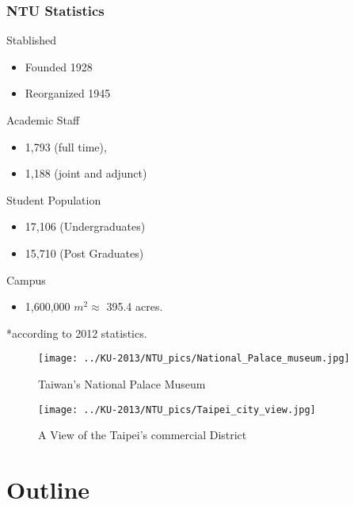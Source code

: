 \begin{frame} \frametitle{NTU Statistics}
 \begin{orangeitemize}
  \item Stablished
    \begin{itemize}
     \item Founded 1928
     \item Reorganized 1945
    \end{itemize}
  \item Academic Staff
    \begin{itemize}
     \item 1,793 (full time),
     \item 1,188 (joint and adjunct)
    \end{itemize}
  \item Student Population
    \begin{itemize}
     \item 17,106 (Undergraduates)
     \item 15,710 (Post Graduates)
    \end{itemize}
  \item Campus
    \begin{itemize}
     \item 1,600,000 $m^2 \approx$ 395.4 acres.
    \end{itemize}
 \end{orangeitemize}
 *according to 2012 statistics.
\end{frame}

\begin{frame}
\begin{figure}
 \centering
 \texttt{[image: ../KU-2013/NTU\_pics/National\_Palace\_museum.jpg]}
 \caption{Taiwan's National Palace Museum}
 \label{fig:National_Palace_museum}
\end{figure}
\end{frame}

\begin{frame}
\begin{figure}
 \centering
 \texttt{[image: ../KU-2013/NTU\_pics/Taipei\_city\_view.jpg]}
 \caption{A View of the Taipei's commercial District}
 \label{fig:Taipei_city_view}
\end{figure}
\end{frame}

\section*{Outline} 

